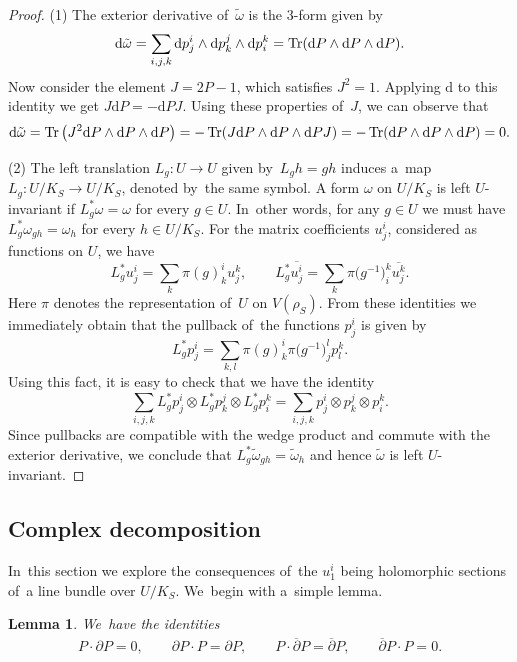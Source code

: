 \documentclass[pdftex]{sigma}
\numberwithin{equation}{section}
\newtheorem{Lemma}[Theorem]{Lemma}
\newcommand{\diff}{\mathrm{d}}
\newcommand{\del}{\partial}
\newcommand{\delbar}{\overline{\partial}}
\newcommand{\kafot}{\tilde{\omega}}
\begin{document}
\begin{proof}
(1) The exterior derivative of~$\kafot$ is the $3$-form given by
\[
\diff \kafot = \sum_{i, j, k} \diff p^i_j \wedge \diff p^j_k \wedge \diff p^k_i = \mathop{\rm Tr}(\diff P \wedge \diff P \wedge \diff P).
\]
Now consider the element $J = 2 P - 1$, which satisfies $J^2 = 1$.
Applying $\diff$ to this identity we get $J \diff P = - \diff P J$.
Using these properties of~$J$, we can observe that
\[
\diff \kafot = \mathop{\rm Tr}\big(J^2 \diff P \wedge \diff P \wedge \diff P\big) = - \mathop{\rm Tr}(J \diff P \wedge \diff P \wedge \diff P J)
 = - \mathop{\rm Tr}(\diff P \wedge \diff P \wedge \diff P) = 0.
\]

(2) The left translation $L_g\colon U \to U$ given by~$L_g h = g h$ induces a~map $L_g\colon U / K_S \to U / K_S$, denoted by~the same symbol.
A form $\omega$ on $U / K_S$ is left $U$-invariant if $L_g^* \omega = \omega$ for every $g \in U$.
In~other words, for any $g \in U$ we must have $L_g^* \omega_{g h} = \omega_h$ for every $h \in U / K_S$.
For the matrix coefficients $u^i_j$, considered as functions on $U$, we have
\[
L_g^* u^i_j = \sum_k \pi(g)^i_k u^k_j, \qquad
L_g^* \overline{u^i_j} = \sum_k \pi\big(g^{-1}\big)^k_i \overline{u^k_j}.
\]
Here $\pi$ denotes the representation of~$U$ on $V(\rho_S)$.
From these identities we immediately obtain that the pullback of~the functions $p^i_j$ is given by
\[
L_g^* p^i_j = \sum_{k, l} \pi(g)^i_k \pi\big(g^{-1}\big)^l_j p^k_l.
\]
Using this fact, it is easy to check that we have the identity
\[
\sum_{i, j, k} L_g^* p^i_j \otimes L_g^* p^j_k \otimes L_g^* p^k_i = \sum_{i, j, k} p^i_j \otimes p^j_k \otimes p^k_i.
\]
Since pullbacks are compatible with the wedge product and commute with the exterior derivative, we conclude that $L_g^* \kafot_{g h} = \kafot_h$ and hence $\kafot$ is left $U$-invariant.
\end{proof}

\subsection{Complex decomposition}

In~this section we explore the consequences of~the $u^i_1$ being holomorphic sections of~a line bundle over $U / K_S$.
We~begin with a~simple lemma.

\begin{Lemma}
\label{lem:diff-ids}
We~have the identities
\begin{gather*}
P \cdot \del P = 0,
\qquad \del P \cdot P = \del P,
\qquad
 P \cdot \delbar P = \delbar P, \qquad
 \delbar P \cdot P = 0.
\end{gather*}
\end{Lemma}
\end{document}
